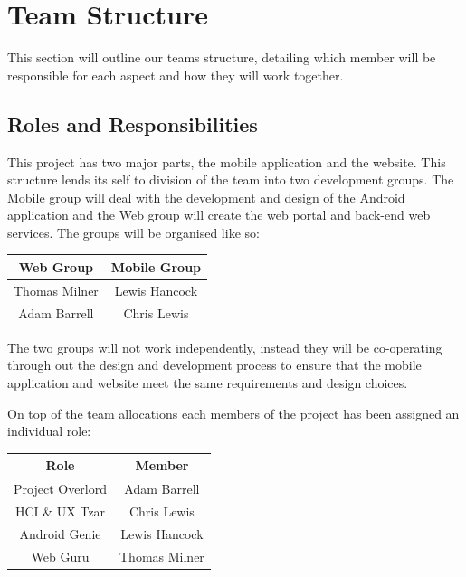 \documentclass[11pt,a4paper]{article}
\begin{document}
\section{Team Structure}
\label{sec:team-structure}
This section will outline our teams structure, detailing which member will be responsible for each aspect and how they will work together. 

\subsection{Roles and Responsibilities}
This project has two major parts, the mobile application and the website. This structure lends its self to division of the team into two development groups. The Mobile group will deal with the development and design of the Android application and the Web group will create the web portal and back-end web services. The groups will be organised like so:  
\begin{table}[h]
\begin{center}
\begin{tabular}{|c|c|}
\hline
\textbf{Web Group} & \textbf{Mobile Group} \\
\hline
Thomas Milner & Lewis Hancock \\
Adam Barrell & Chris Lewis \\ \hline
\end{tabular}
\end{center}
\end{table}

The two groups will not work independently, instead they will be co-operating through out the design and development process to ensure that the mobile application and website meet the same requirements and design choices. 

On top of the team allocations each members of the project has been assigned an individual role:

\begin{table}[H]
\begin{center}
\begin{tabular}{|c|c|}
\hline
\textbf{Role} & \textbf{Member} \\
\hline
Project Overlord & Adam Barrell  \\\hline
HCI \& UX Tzar & Chris Lewis \\ \hline
Android Genie & Lewis Hancock \\\hline
Web Guru & Thomas Milner \\\hline
\end{tabular}
\end{center}
\end{table}
\end{document}
